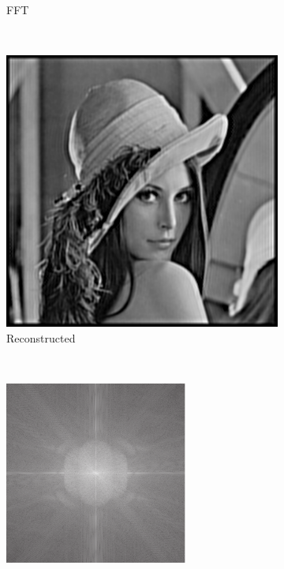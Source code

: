\begin{figure}[h]
\begin{subfigure}[t]{0.23\textwidth}
      \caption{\gls{FFT}}
  \end{subfigure}\\
  \begin{subfigure}[t]{0.23\textwidth}
      \centering
      \includegraphics[width=\textwidth]{sim_slit/recon/reconstruction_no_attenuation-1}
      \caption{Reconstructed}
  \end{subfigure}~
  \begin{subfigure}[t]{0.23\textwidth}
      \centering
      \includegraphics[width=\textwidth]{sim_slit/recon/FFT_reconstruction_no_attenuation}

\end{subfigure}
\end{figure}
